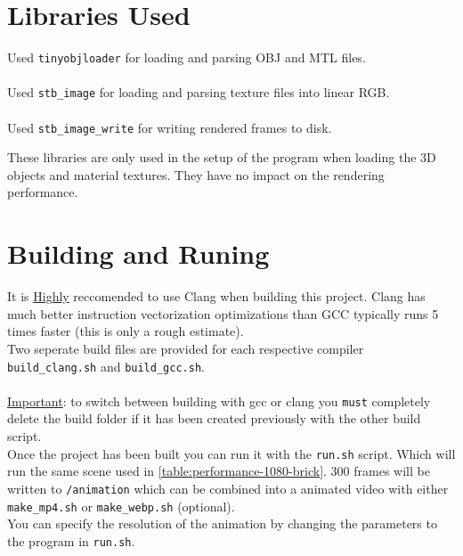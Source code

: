 \documentclass[12pt]{article}
\begin{document}
\section{Libraries Used}

Used \texttt{tinyobjloader}\cite{tinyobjloader} for loading and parsing OBJ and MTL files.\\
\\
Used \texttt{stb\_image}\cite{stb-image} for loading and parsing texture files into linear RGB.\\
\\
Used \texttt{stb\_image\_write}\cite{stb-image-write} for writing rendered frames to disk.

These libraries are only used in the setup of the program when loading the 3D objects and material textures. They have no impact on the rendering performance.

\section{Building and Runing}

It is \underline{Highly} reccomended to use Clang when building this project. Clang has much better instruction vectorization optimizations than GCC typically runs 5 times faster (this is only a rough estimate). 
\\

Two seperate build files are provided for each respective compiler \texttt{build\_clang.sh} and \texttt{build\_gcc.sh}. \\
\\
\underline{Important}: to switch between building with gcc or clang you \texttt{must} completely delete the build folder if it has been created previously with the other build script.\\

Once the project has been built you can run it with the \texttt{run.sh} script. Which will run the same scene used in \ref{table:performance-1080-brick}. 300 frames will be written to \texttt{/animation} which can be combined into a animated video with either \texttt{make\_mp4.sh} or \texttt{make\_webp.sh} (optional). \\

You can specify the resolution of the animation by changing the parameters to the program in \texttt{run.sh}.


\nocite{*}


\end{document}
